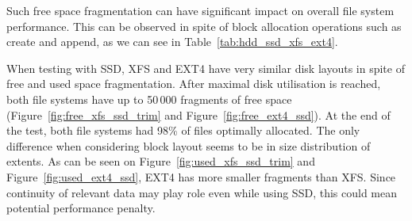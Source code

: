 \documentclass[
  color, %
  table, %
  lof,   %
  lot,   %
]{fithesis3}
\begin{document}
Such free space fragmentation can have significant impact on overall file system performance. This can be observed in spite of block allocation operations such as create and append, as we can see in Table~\ref{tab:hdd_ssd_xfs_ext4}.


When testing with SSD, XFS and EXT4 have very similar disk layouts in spite of free and used space fragmentation. After maximal disk utilisation is reached, both file systems have up to 50\,000 fragments of free space (Figure~\ref{fig:free_xfs_ssd_trim} and Figure~\ref{fig:free_ext4_ssd}). At the end of the test, both file systems had 98\% of files optimally allocated. The only difference when considering block layout seems to be in size distribution of extents. As can be seen on Figure~\ref{fig:used_xfs_ssd_trim} and Figure~\ref{fig:used_ext4_ssd}, EXT4 has more smaller fragments than XFS. Since continuity of relevant data may play role even while using SSD, this could mean potential performance penalty.
\end{document}
